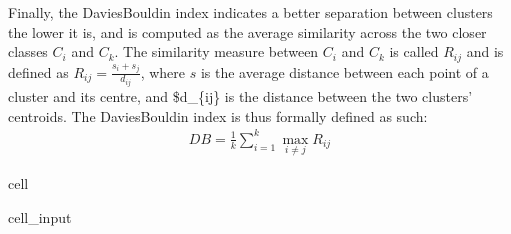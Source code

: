 \documentclass[letterpaper,10pt,english]{jupyterBook}
\begin{document}
\sphinxAtStartPar
Finally, the Davies\sphinxhyphen{}Bouldin index indicates a better separation between clusters the lower it is, and is computed as the average similarity across the two closer classes \(C_i\) and \(C_k\). The similarity measure between \(C_i\) and \(C_k\) is called \(R_{ij}\) and is defined as \(R_{ij} = \frac{s_i + s_j}{d_{ij}}\), where \(s\) is the average distance between each point of a cluster and its centre, and \$d\_\{ij\} is the distance between the two clusters’ centroids. The Davies\sphinxhyphen{}Bouldin index is thus formally defined as such:
\begin{equation*}
\begin{split}
DB = \frac{1}{k} \sum_{i=1}^k \max_{i \neq j} R_{ij}
\end{split}
\end{equation*}
\begin{sphinxuseclass}{cell}
\begin{sphinxuseclass}{cell_input}
\begin{sphinxVerbatim}[commandchars=\\\{\}]
     
   
   
   


     
       
          \PYG{p}{[} \PYG{p}{]}
     


   
\end{sphinxVerbatim}

\end{sphinxuseclass}
\end{sphinxuseclass}
\end{document}
